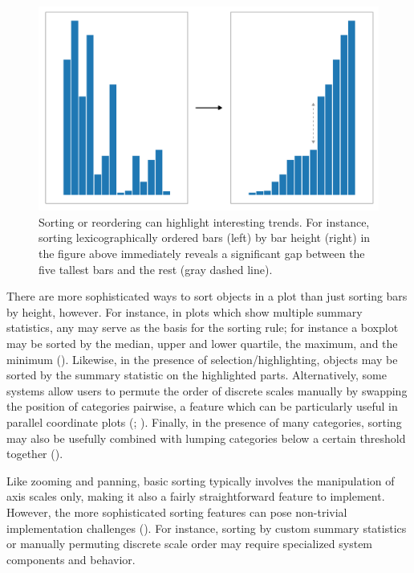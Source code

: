 \documentclass[
]{book}
\theoremstyle{definition}
\theoremstyle{definition}
\theoremstyle{definition}
\theoremstyle{definition}
\theoremstyle{remark}
\begin{document}
\begin{figure}

{\centering \includegraphics[width=1\linewidth,height=1\textheight]{./figures/sorting} 

}

\caption{Sorting or reordering can highlight interesting trends. For instance, sorting lexicographically ordered bars (left) by bar height (right) in the figure above immediately reveals a significant gap between the five tallest bars and the rest (gray dashed line).}\label{fig:sorting}
\end{figure}

There are more sophisticated ways to sort objects in a plot than just sorting bars by height, however. For instance, in plots which show multiple summary statistics, any may serve as the basis for the sorting rule; for instance a boxplot may be sorted by the median, upper and lower quartile, the maximum, and the minimum (). Likewise, in the presence of selection/highlighting, objects may be sorted by the summary statistic on the highlighted parts. Alternatively, some systems allow users to permute the order of discrete scales manually by swapping the position of categories pairwise, a feature which can be particularly useful in parallel coordinate plots (; ). Finally, in the presence of many categories, sorting may also be usefully combined with lumping categories below a certain threshold together ().

Like zooming and panning, basic sorting typically involves the manipulation of axis scales only, making it also a fairly straightforward feature to implement. However, the more sophisticated sorting features can pose non-trivial implementation challenges (). For instance, sorting by custom summary statistics or manually permuting discrete scale order may require specialized system components and behavior.
\end{document}
